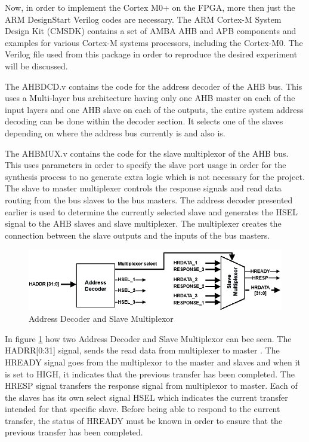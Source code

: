 Now, in order to implement the Cortex M0+ on the FPGA, more then just the ARM DesignStart Verilog codes are necessary. The ARM Cortex-M System Design Kit (CMSDK) contains a set of AMBA AHB and APB components and examples for various Cortex-M systems processors, including the Cortex-M0. The  Verilog file  used from this package in order to reproduce the desired experiment will be discussed.

The AHBDCD.v contains the code for the address decoder of the AHB bus. This uses a Multi-layer bus architecture having only one AHB master on each of the input layers and one AHB slave on each of the outputs, the entire system address decoding can be done within the decoder section. It selects one of the slaves depending on where the address bus currently is and also is.

The AHBMUX.v contains the code for the slave multiplexor of the AHB bus. This uses parameters in order to specify the slave port usage in order for the synthesis process to no generate extra logic which is not necessary for the project. The slave to master multiplexer controls the response signals and read data routing from the bus slaves to the bus masters. The address decoder presented earlier is used to determine the currently selected slave and generates the HSEL signal to the AHB slaves and slave multiplexer. The multiplexer creates the connection between the slave outputs and the inputs of the bus masters. 

\begin{figure}
\centering
\includegraphics[scale=0.7]{figures/decoder_and_multiplexer.PNG}
\caption{Address Decoder and Slave Multiplexor } 
\label{fig:decoder_multiplexer}
\end{figure}
In figure \ref{fig:decoder_multiplexer} how two Address Decoder and Slave Multiplexor can bee seen. The HADRR[0:31] signal, sends the read data from multiplexer to master \cite{ahblite}. The HREADY signal goes from the multiplexor to the master and slaves and when it is set to HIGH, it indicates that the previous transfer has been completed. The HRESP signal transfers the response signal from multiplexor to master. Each of the slaves has its own select signal HSEL which indicates the current transfer intended for that specific slave. Before being able to respond to the current transfer, the status of HREADY must be known in order to ensure that the previous transfer has been completed. 

